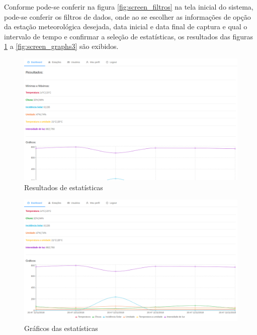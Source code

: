 Conforme pode-se conferir na figura \ref{fig:screen_filtros} na tela inicial do sistema, pode-se conferir os filtros de dados, onde ao se escolher as informações de opção da estação meteorológica desejada, data inicial e data final de captura e qual o intervalo de tempo e confirmar a seleção de estatísticas, os resultados das figuras \ref{fig:screen_graphs1} a \ref{fig:screen_graphs3} são exibidos.

\begin{figure}[H]
    \centering
    \caption{Resultados de estatísticas \label{fig:screen_graphs1}}
    \includegraphics[scale=0.3]{telas/grafico1.png}
    \hfill
{}
\end{figure}

\begin{figure}[H]
    \centering
    \caption{Gráficos das estatísticas \label{fig:screen_graphs2}}
    \includegraphics[scale=0.3]{telas/grafico2.png}
    \hfill
{}
\end{figure}

